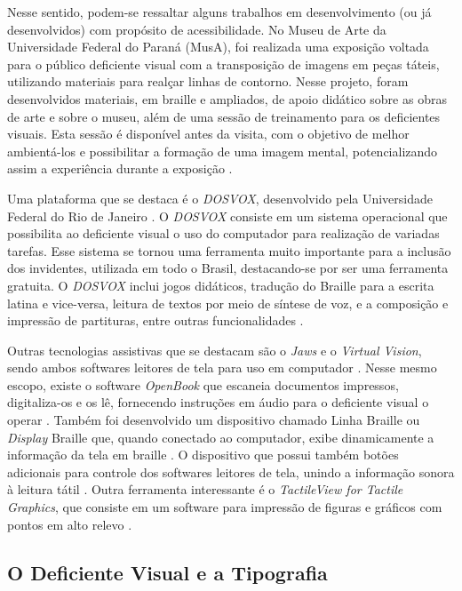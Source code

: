 Nesse sentido, podem-se ressaltar alguns trabalhos em desenvolvimento (ou já desenvolvidos) com propósito de acessibilidade. No Museu de Arte da Universidade Federal do Paraná (MusA), foi realizada uma exposição voltada para o público deficiente visual com a transposição de imagens em peças táteis, utilizando materiais para realçar linhas de contorno. Nesse projeto, foram desenvolvidos materiais, em braille e ampliados, de apoio didático sobre as obras de arte e sobre o museu, além de uma sessão de treinamento para os deficientes visuais. Esta sessão é disponível antes da visita, com o objetivo de melhor ambientá-los e possibilitar a formação de uma imagem mental, potencializando assim a experiência durante a exposição .

Uma plataforma que se destaca é o \textit{DOSVOX}, desenvolvido pela Universidade Federal do Rio de Janeiro . O \textit{DOSVOX} consiste em um sistema operacional que possibilita ao deficiente visual o uso do computador para realização de variadas tarefas. Esse sistema se tornou uma ferramenta muito importante para a inclusão dos invidentes, utilizada em todo o Brasil, destacando-se por ser uma ferramenta gratuita. O \textit{DOSVOX} inclui jogos didáticos, tradução do Braille para a escrita latina e vice-versa, leitura de textos por meio de síntese de voz, e a composição e impressão de partituras, entre outras funcionalidades .

Outras tecnologias assistivas que se destacam são o \textit{Jaws} e o \textit{Virtual Vision}, sendo ambos softwares leitores de tela para uso em computador  . Nesse mesmo escopo, existe o software \textit{OpenBook} que escaneia documentos impressos, digitaliza-os e os lê, fornecendo instruções em áudio para o deficiente visual o operar .
Também foi desenvolvido um dispositivo chamado Linha Braille ou \textit{Display} Braille que, quando conectado ao computador, exibe dinamicamente a informação da tela em braille . O dispositivo que possui também botões adicionais para controle dos softwares leitores de tela, unindo a informação sonora à leitura tátil . Outra ferramenta interessante é o \textit{TactileView for Tactile Graphics}, que consiste em um software para impressão de figuras e gráficos com pontos em alto relevo  .

\subsection{O Deficiente Visual e a Tipografia}

